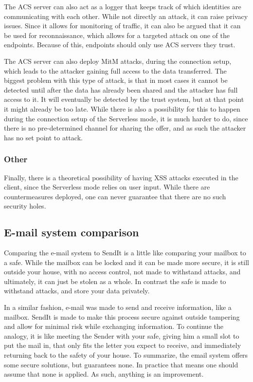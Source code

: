   The ACS server can also act as a logger that keeps track of which identities are communicating with each other. While not directly an attack, it can raise privacy issues. Since it allows for monitoring of traffic, it can also be argued that it can be used for reconnaissance, which allows for a targeted attack on one of the endpoints. Because of this, endpoints should only use ACS servers they trust.

  The ACS server can also deploy MitM attacks, during the connection setup, which leads to the attacker gaining full access to the data transferred. The biggest problem with this type of attack, is that in most cases it cannot be detected until after the data has already been shared and the attacker has full access to it. It will eventually be detected by the trust system, but at that point it might already be too late. While there is also a possibility for this to happen during the connection setup of the Serverless mode, it is much harder to do, since there is no pre-determined channel for sharing the offer, and as such the attacker has no set point to attack. 
%
  \subsubsection*{Other}
  Finally, there is a theoretical possibility of having XSS attacks executed in the client, since the Serverless mode relies on user input. While there are countermeasures deployed, one can never guarantee that there are no such security holes.

%
%
\subsection{E-mail system comparison}
\label{sec:email_syst}
  Comparing the e-mail system to SendIt is a little like comparing your mailbox to a safe. While the mailbox can be locked and it can be made more secure, it is still outside your house, with no access control, not made to withstand attacks, and ultimately, it can just be stolen as a whole. In contrast the safe is made to withstand attacks, and store your data privately.

  In a similar fashion, e-mail was made to send and receive information, like a mailbox. SendIt is made to make this process secure against outside tampering and allow for minimal risk while exchanging information. To continue the analogy, it is like meeting the Sender with your safe, giving him a small slot to put the mail in, that only fits the letter you expect to receive, and immediately returning back to the safety of your house. To summarize, the email system offers some secure solutions, but guarantees none. In practice that means one should assume that none is applied. As such, anything is an improvement.
%
%
